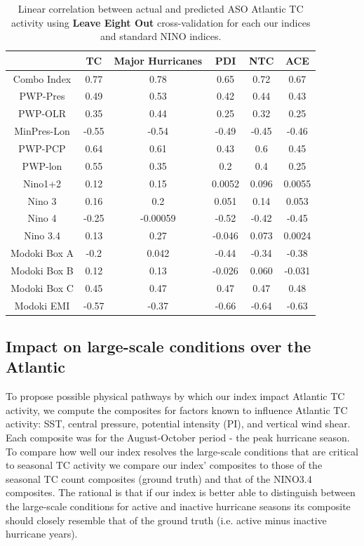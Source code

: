 \documentclass[]{article}
\begin{document}
\begin{table}
\begin{tabular}{cccccc}
\hline
& TC & Major Hurricanes & PDI & NTC & ACE\\
\hline
Combo Index & 0.77 & 0.78 & 0.65 & 0.72 & 0.67\\
PWP-Pres & 0.49 & 0.53 & 0.42 & 0.44 & 0.43\\
PWP-OLR & 0.35 & 0.44 & 0.25 & 0.32 & 0.25\\
MinPres-Lon & -0.55 & -0.54 & -0.49 & -0.45 & -0.46\\
PWP-PCP & 0.64 & 0.61 & 0.43 & 0.6 & 0.45\\
PWP-lon & 0.55 & 0.35 & 0.2 & 0.4 & 0.25\\
Nino1+2 & 0.12 & 0.15 & 0.0052 & 0.096 & 0.0055\\
Nino 3 & 0.16 & 0.2 & 0.051 & 0.14 & 0.053\\
Nino 4 & -0.25 & -0.00059 & -0.52 & -0.42 & -0.45\\
Nino 3.4 & 0.13 & 0.27 & -0.046 & 0.073 & 0.0024\\
Modoki Box A & -0.2 & 0.042 & -0.44 & -0.34 & -0.38\\
Modoki Box B & 0.12 & 0.13 & -0.026 & 0.060 & -0.031\\
Modoki Box C & 0.45 & 0.47 & 0.47 & 0.47 & 0.48\\
Modoki EMI & -0.57 & -0.37 & -0.66 & -0.64 & -0.63\\
\hline
\end{tabular}
\caption{Linear correlation between actual and predicted ASO Atlantic TC activity using \textbf{Leave Eight Out} cross-validation for each our indices and standard NINO indices.}
\label{ref:l4o_corr}
\end{table}


\subsection{Impact on large-scale conditions over the Atlantic}
To propose possible physical pathways by which our index impact Atlantic TC activity, we compute the composites for factors known to influence Atlantic TC activity: SST, central pressure, potential intensity (PI), and vertical wind shear. Each composite was for the August-October period - the peak hurricane season. To compare how well our index resolves the large-scale conditions that are critical to seasonal TC activity we compare our index' composites to those of the seasonal TC count composites (ground truth) and that of the NINO3.4 composites. The rational is that if our index is better able to distinguish between the large-scale conditions for active and inactive hurricane seasons its composite should closely resemble that of the ground truth (i.e. active minus inactive hurricane years).
\end{document}
